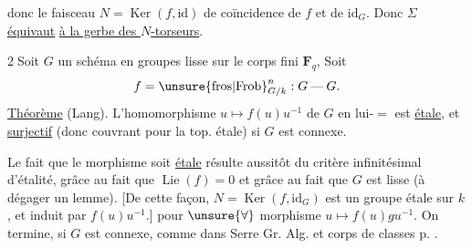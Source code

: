 donc le faisceau $N=\operatorname{Ker}(f,\mathrm{id})$ de coïncidence
de $f$ et de $\mathrm{id}_G$. Donc $\Sigma$ \uline{équivaut}
\uline{à la gerbe des $N$-torseurs}.

\textcircled{2}\quad Soit $G$ un schéma en groupes lisse  sur le
corps fini $\mathbf F_q$,  Soit
\[
f=\unsure{\mathrm{fros}|\mathrm{Frob}}^n_{G/k}:G\mathbin{\text{---}}G.
\]
\uline{Théorème} (Lang). L'homomorphisme $u\mapsto f(u)u^{-1}$ de $G$ en
lui-$=$ est \uline{étale}, et \uline{surjectif} (donc couvrant
pour la top. étale) si $G$ est connexe.

Le fait que le morphisme soit \uline{étale} résulte
aussitôt du critère infinitésimal d'étalité, grâce au fait
que  $\operatorname{Lie}(f)=0$ et grâce au fait que $G$
est lisse (à dégager un lemme). 
[De cette façon, $N=\operatorname{Ker}(f,\mathrm{id}_G)$ est un groupe étale
 sur $k$, et
induit par $f(u)u^{-1}$.]
 pour $\unsure{\forall}$
morphisme $u\mapsto f(u)g u^{-1}$. On termine, si $G$
est connexe, comme dans Serre Gr. Alg. et corps de classes
p. .


